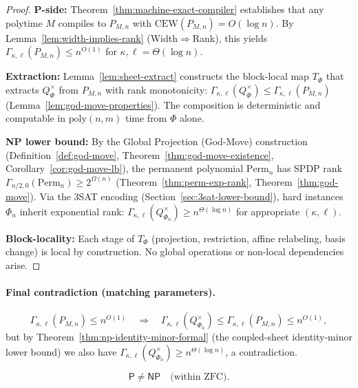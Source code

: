\documentclass[12pt]{article}
\theoremstyle{definition}
\theoremstyle{definition}
\theoremstyle{remark}
\theoremstyle{remark}
\begin{document}
\begin{proof}
\textbf{P-side:} Theorem~\ref{thm:machine-exact-compiler} establishes that any polytime $M$ compiles to $P_{M,n}$ with $\mathrm{CEW}(P_{M,n}) = O(\log n)$. By Lemma~\ref{lem:width-implies-rank} (Width$\Rightarrow$Rank), this yields $\Gamma_{\kappa,\ell}(P_{M,n}) \leq n^{O(1)}$ for $\kappa, \ell = \Theta(\log n)$.

\textbf{Extraction:} Lemma~\ref{lem:sheet-extract} constructs the block-local map $T_\Phi$ that extracts $Q^{\times}_\Phi$ from $P_{M,n}$ with rank monotonicity: $\Gamma_{\kappa,\ell}(Q^{\times}_\Phi) \leq \Gamma_{\kappa,\ell}(P_{M,n})$ (Lemma~\ref{lem:god-move-properties}). The composition is deterministic and computable in $\mathrm{poly}(n,m)$ time from $\Phi$ alone.

\textbf{NP lower bound:} By the Global Projection (God-Move) construction (Definition~\ref{def:god-move}, Theorem~\ref{thm:god-move-existence}, Corollary~\ref{cor:god-move-lb}), the permanent polynomial $\mathrm{Perm}_n$ has SPDP rank $\Gamma_{n/2,0}(\mathrm{Perm}_n) \geq 2^{\Omega(n)}$ (Theorem~\ref{thm:perm-exp-rank}, Theorem~\ref{thm:god-move}). Via the 3SAT encoding (Section~\ref{sec:3sat-lower-bound}), hard instances $\Phi_n$ inherit exponential rank: $\Gamma_{\kappa,\ell}(Q^{\times}_{\Phi_n}) \geq n^{\Theta(\log n)}$ for appropriate $(\kappa,\ell)$.

\textbf{Block-locality:} Each stage of $T_\Phi$ (projection, restriction, affine relabeling, basis change) is local by construction. No global operations or non-local dependencies arise.
\end{proof}

\paragraph{Final contradiction (matching parameters).}
\[
\Gamma_{\kappa,\ell}(P_{M,n}) \le n^{O(1)}
\quad\Rightarrow\quad
\Gamma_{\kappa,\ell}(Q^{\times}_{\Phi_n}) \le \Gamma_{\kappa,\ell}(P_{M,n}) \le n^{O(1)},
\]
but by Theorem~\ref{thm:np-identity-minor-formal} (the coupled-sheet identity-minor lower bound) we also have
\(
\Gamma_{\kappa,\ell}(Q^{\times}_{\Phi_n}) \ge n^{\Theta(\log n)}
\), a contradiction.

\[
\boxed{\mathsf{P} \neq \mathsf{NP} \quad\text{(within ZFC)}.}
\]
\end{document}
